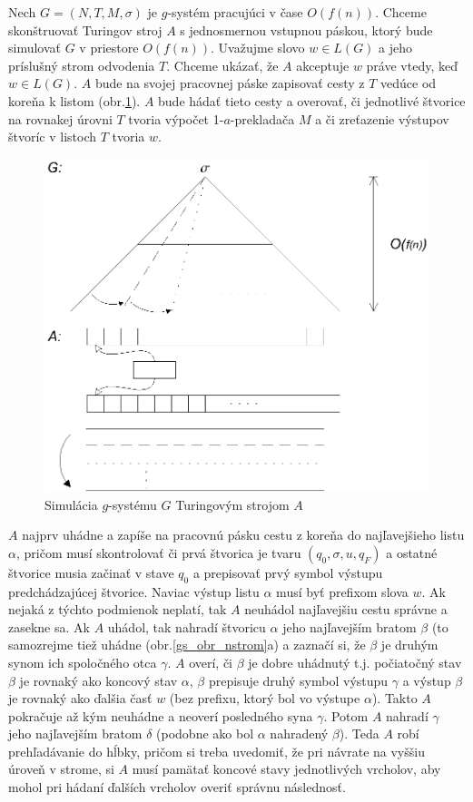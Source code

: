 \begin{dokaz}
Nech $G=(N,T,M,\sigma)$ je $g$-systém pracujúci v čase $O(f(n))$.
Chceme skonštruovať Turingov stroj $A$ s jednosmernou vstupnou
páskou, ktorý bude simulovať $G$ v priestore $O(f(n))$. Uvažujme
slovo $w\in L(G)$ a jeho príslušný strom odvodenia $T$. Chceme
ukázať, že $A$ akceptuje $w$ práve vtedy, keď $w\in L(G)$.  $A$
bude na svojej pracovnej páske zapisovať cesty z $T$ vedúce od
koreňa k listom (obr.\ref{gs_obr_nspace}). $A$ bude hádať tieto cesty a
overovať, či jednotlivé štvorice na rovnakej úrovni $T$ tvoria
výpočet 1-$a$-prekladača $M$ a či zreťazenie výstupov štvoríc v
listoch $T$ tvoria $w$.

\begin{figure}[!ht]
\centering
\includegraphics{img/gsystems/nspace}
\caption{Simulácia $g$-systému $G$ Turingovým strojom $A$}
\label{gs_obr_nspace}
\end{figure}

$A$ najprv uhádne a zapíše na pracovnú pásku cestu z koreňa do
najľavejšieho listu $\alpha$, pričom musí skontrolovať či prvá
štvorica je tvaru $(q_0,\sigma,u,q_F)$ a ostatné štvorice musia
začinať v stave $q_0$ a prepisovať prvý symbol výstupu
predchádzajúcej štvorice. Naviac výstup listu $\alpha$ musí byť
prefixom slova $w$. Ak nejaká z týchto podmienok neplatí, tak $A$
neuhádol najľavejšiu cestu správne a zasekne sa. Ak $A$ uhádol,
tak nahradí štvoricu $\alpha$ jeho najľavejším bratom $\beta$ (to
samozrejme tiež uhádne (obr.\ref{gs_obr_nstrom}a) a zaznačí si, že
$\beta$ je druhým synom ich spoločného otca $\gamma$. $A$ overí,
či $\beta$ je dobre uhádnutý t.j. počiatočný stav $\beta$ je
rovnaký ako koncový stav $\alpha$,  $\beta$ prepisuje druhý symbol
výstupu $\gamma$ a výstup $\beta$ je rovnaký ako ďalšia časť $w$
(bez prefixu, ktorý bol vo výstupe $\alpha$). Takto $A$ pokračuje
až kým neuhádne a neoverí posledného syna $\gamma$. Potom $A$
nahradí $\gamma$ jeho najľavejším bratom $\delta$ (podobne ako bol
$\alpha$ nahradený $\beta$). Teda $A$ robí prehľadávanie do hĺbky,
pričom si treba uvedomiť, že pri návrate na vyššiu úroveň v
strome, si $A$ musí pamätať koncové stavy jednotlivých vrcholov,
aby mohol pri hádaní ďalších vrcholov overiť správnu následnosť.


\end{dokaz}
